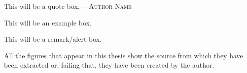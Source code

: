 \begin{quoteBox}
  This will be a quote box.
  \tcblower{}
  ---\textsc{Author Name}
\end{quoteBox}

\begin{exampleBox}
  This will be an example box.
\end{exampleBox}

\begin{remarkBox}
  This will be a remark/alert box.
\end{remarkBox}

All the figures that appear in this thesis show the source from which they have
been extracted or, failing that, they have been created by the author.
